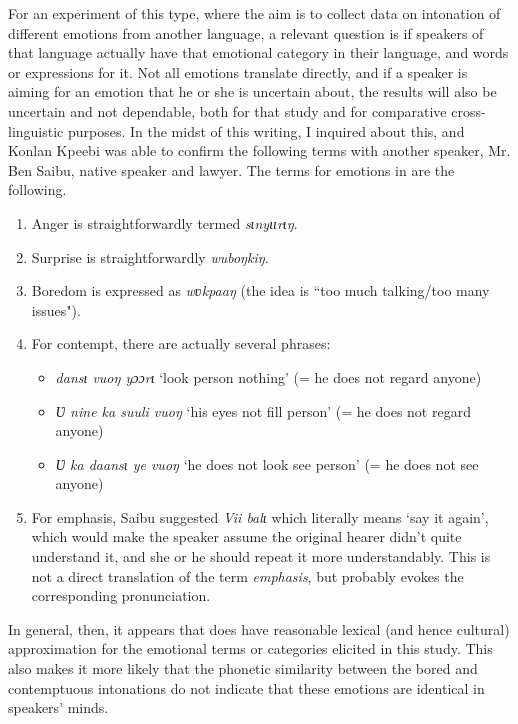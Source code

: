 \documentclass[output=paper]{langsci/langscibook}
\begin{document}
For an experiment of this type, where the aim is to collect data on intonation of different emotions from another language, a relevant question is if speakers of that language actually have that emotional category in their language, and words or expressions for it. Not all emotions translate directly, and if a speaker is aiming for an emotion that he or she is uncertain about, the results will also be uncertain and not dependable, both for that study and for comparative cross-linguistic purposes. In the midst of this writing, I inquired about this, and Konlan Kpeebi was able to confirm the following terms with another  speaker, Mr. Ben Saibu, native  speaker and lawyer. The terms for emotions in  are the following.


\begin{enumerate}
\item Anger is straightforwardly termed \emph{sɩnyɩɩrɩŋ}.
\item Surprise is straightforwardly \emph{wuboŋkiŋ}. 
\item Boredom is expressed as \emph{wʋkpaaŋ} (the idea is ``too much talking/too many issues").
\item For contempt, there are actually several phrases: 

\begin{itemize}
\item \emph{dansɩ vuoŋ yɔɔrɩ} `look person nothing' (= he does not regard anyone) 
\item \emph{Ʋ nine ka suuli vuoŋ} `his eyes not fill person' (= he does not regard anyone) 
\item \emph{Ʋ ka daansɩ ye vuoŋ} `he does not look see person' (= he does not see anyone)
\end{itemize}
\item For emphasis, Saibu suggested \textit{Vii balɩ} which literally means `say it again', which would make the speaker assume the original hearer didn't quite understand it, and she or he should repeat it more understandably. This is not a direct translation of the  term \emph{emphasis}, but probably evokes the corresponding pronunciation.
\end{enumerate}

In general, then, it appears that  does have reasonable lexical (and hence cultural) approximation for the emotional terms or categories elicited in this study. This also makes it more likely that the phonetic similarity between the bored and contemptuous intonations do not indicate that these emotions are identical in speakers' minds. 
\end{document}
